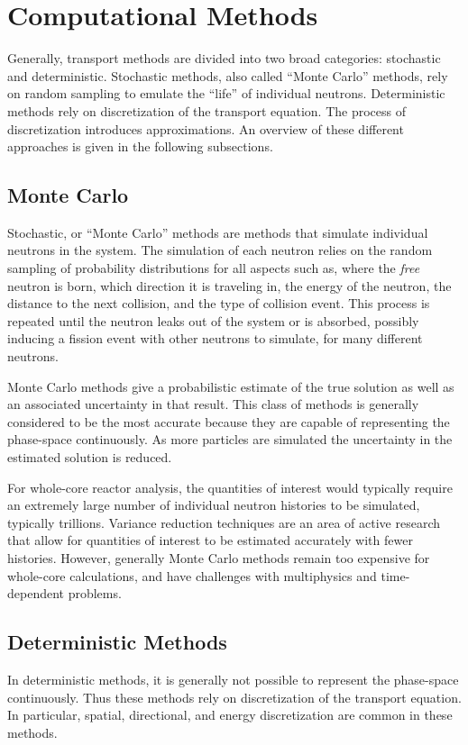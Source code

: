 {    \section{Computational Methods}{\label{sec:NTT:Computational Methods}
        Generally, transport methods are divided into two broad categories: stochastic and deterministic.
        Stochastic methods, also called ``Monte Carlo'' methods, rely on random sampling to emulate the ``life'' of individual neutrons.
        Deterministic methods rely on discretization of the transport equation.
        The process of discretization introduces approximations.
        An overview of these different approaches is given in the following subsections.

        \subsection{Monte Carlo}{\label{ssec:NTT:Monte Carlo}
            Stochastic, or ``Monte Carlo'' methods are methods that simulate individual neutrons in the system.
            The simulation of each neutron relies on the random sampling of probability distributions for all aspects such as, where the \emph{free} neutron is born, which direction it is traveling in, the energy of the neutron, the distance to the next collision, and the type of collision event.
            This process is repeated until the neutron leaks out of the system or is absorbed, possibly inducing a fission event with other neutrons to simulate, for many different neutrons.

            Monte Carlo methods give a probabilistic estimate of the true solution as well as an associated uncertainty in that result.
            This class of methods is generally considered to be the most accurate because they are capable of representing the phase-space continuously.
            As more particles are simulated the uncertainty in the estimated solution is reduced.

            For whole-core reactor analysis, the quantities of interest would typically require an extremely large number of individual neutron histories to be simulated, typically trillions.
            Variance reduction techniques are an area of active research that allow for quantities of interest to be estimated accurately with fewer histories. %
            However, generally Monte Carlo methods remain too expensive for whole-core calculations, and have challenges with multiphysics and time-dependent problems.
        }
        \subsection{Deterministic Methods}{\label{ssec:NTT:Deterministic Methods}
            In deterministic methods, it is generally not possible to represent the phase-space continuously.
            Thus these methods rely on discretization of the transport equation.
            In particular, spatial, directional, and energy discretization are common in these methods.
            
}}}
